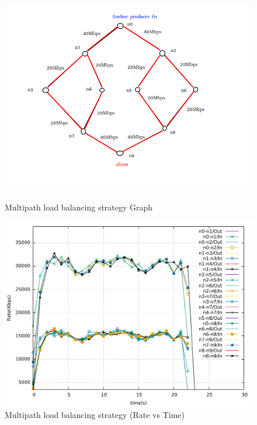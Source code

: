 \begin{figure}[H]

\begin{center}

\includegraphics[scale = 0.5]{Figures/Load.png}

\caption{Multipath load balancing strategy Graph} \label{Load} 


\includegraphics[scale = 0.4]{Figures/load.pdf}

\caption{Multipath load balancing strategy (Rate vs Time) } \label{load} 


\end{center}

\end{figure}




